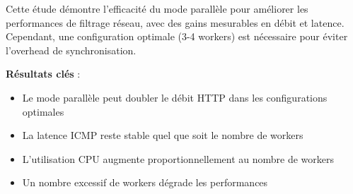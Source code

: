 \documentclass[12pt,a4paper]{article}
\begin{document}
Cette étude démontre l'efficacité du mode parallèle pour améliorer les performances de filtrage réseau, avec des gains mesurables en débit et latence. Cependant, une configuration optimale (3-4 workers) est nécessaire pour éviter l'overhead de synchronisation.

\textbf{Résultats clés} :
\begin{itemize}
    \item Le mode parallèle peut doubler le débit HTTP dans les configurations optimales
    \item La latence ICMP reste stable quel que soit le nombre de workers
    \item L'utilisation CPU augmente proportionnellement au nombre de workers
    \item Un nombre excessif de workers dégrade les performances
\end{itemize}
\end{document}
